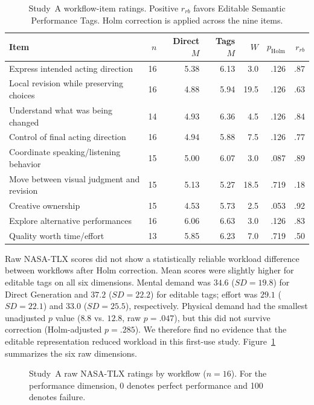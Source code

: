 \begin{table}[t]
\centering
\caption{Study~A workflow-item ratings. Positive $r_{rb}$ favors Editable Semantic Performance Tags. Holm correction is applied across the nine items.}
\label{tab:workflow-results}
\small
\begin{tabular}{lrrrrrr}
\toprule
Item & $n$ & Direct $M$ & Tags $M$ & $W$ & $p_{\mathrm{Holm}}$ & $r_{rb}$\\
\midrule
Express intended acting direction & 16 & 5.38 & 6.13 & 3.0 & .126 & .87\\
Local revision while preserving choices & 16 & 4.88 & 5.94 & 19.5 & .126 & .63\\
Understand what was being changed & 14 & 4.93 & 6.36 & 4.5 & .126 & .84\\
Control of final acting direction & 16 & 4.94 & 5.88 & 7.5 & .126 & .77\\
Coordinate speaking/listening behavior & 15 & 5.00 & 6.07 & 3.0 & .087 & .89\\
Move between visual judgment and revision & 15 & 5.13 & 5.27 & 18.5 & .719 & .18\\
Creative ownership & 15 & 4.53 & 5.73 & 2.5 & .053 & .92\\
Explore alternative performances & 16 & 6.06 & 6.63 & 3.0 & .126 & .83\\
Quality worth time/effort & 13 & 5.85 & 6.23 & 7.0 & .719 & .50\\
\bottomrule
\end{tabular}
\end{table}

Raw NASA-TLX scores did not show a statistically reliable workload difference between workflows after Holm correction. Mean scores were slightly higher for editable tags on all six dimensions. Mental demand was $34.6$ ($SD=19.8$) for Direct Generation and $37.2$ ($SD=22.2$) for editable tags; effort was $29.1$ ($SD=22.1$) and $33.0$ ($SD=25.5$), respectively. Physical demand had the smallest unadjusted $p$ value ($8.8$ vs. $12.8$, raw $p=.047$), but this did not survive correction (Holm-adjusted $p=.285$). We therefore find no evidence that the editable representation reduced workload in this first-use study. Figure~\ref{fig:study-a-tlx} summarizes the six raw dimensions.

\begin{figure}[t]
    \centering
    
    \caption{Study~A raw NASA-TLX ratings by workflow ($n=16$). For the performance dimension, 0 denotes perfect performance and 100 denotes failure.}
    \label{fig:study-a-tlx}
\end{figure}

